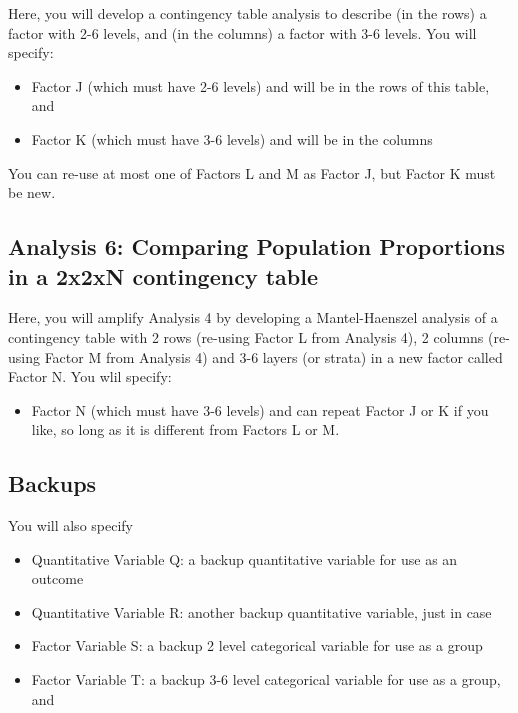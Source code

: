 \documentclass[]{book}
\providecommand{\tightlist}{%
  \setlength{\itemsep}{0pt}\setlength{\parskip}{0pt}}
\theoremstyle{definition}
\theoremstyle{definition}
\theoremstyle{definition}
\theoremstyle{remark}
\begin{document}
Here, you will develop a contingency table analysis to describe (in the
rows) a factor with 2-6 levels, and (in the columns) a factor with 3-6
levels. You will specify:

\begin{itemize}
\tightlist
\item
  Factor J (which must have 2-6 levels) and will be in the rows of this
  table, and
\item
  Factor K (which must have 3-6 levels) and will be in the columns
\end{itemize}

You can re-use at most one of Factors L and M as Factor J, but Factor K
must be new.

\hypertarget{analysis-6-comparing-population-proportions-in-a-2x2xn-contingency-table}{%
\subsection{Analysis 6: Comparing Population Proportions in a 2x2xN
contingency
table}\label{analysis-6-comparing-population-proportions-in-a-2x2xn-contingency-table}}

Here, you will amplify Analysis 4 by developing a Mantel-Haenszel
analysis of a contingency table with 2 rows (re-using Factor L from
Analysis 4), 2 columns (re-using Factor M from Analysis 4) and 3-6
layers (or strata) in a new factor called Factor N. You wlil specify:

\begin{itemize}
\tightlist
\item
  Factor N (which must have 3-6 levels) and can repeat Factor J or K if
  you like, so long as it is different from Factors L or M.
\end{itemize}

\hypertarget{backups}{%
\subsection{Backups}\label{backups}}

You will also specify

\begin{itemize}
\tightlist
\item
  Quantitative Variable Q: a backup quantitative variable for use as an
  outcome
\item
  Quantitative Variable R: another backup quantitative variable, just in
  case
\item
  Factor Variable S: a backup 2 level categorical variable for use as a
  group
\item
  Factor Variable T: a backup 3-6 level categorical variable for use as
  a group, and
\end{itemize}
\end{document}
